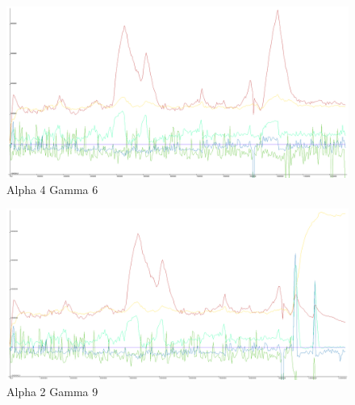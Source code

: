 \begin{figure}[H]
\includegraphics[angle=-90, scale=0.25]{Figures/learningrate/A4G6/test.png}
\caption{Alpha 4 Gamma 6}
\label{fig:app_a4g6_test}
\end{figure}
\begin{figure}[H]
\includegraphics[angle=-90, scale=0.25]{Figures/learningrate/A2G9/test.png}
\caption{Alpha 2 Gamma 9}
\label{fig:app_a2g9_test}
\end{figure}	

\newpage
